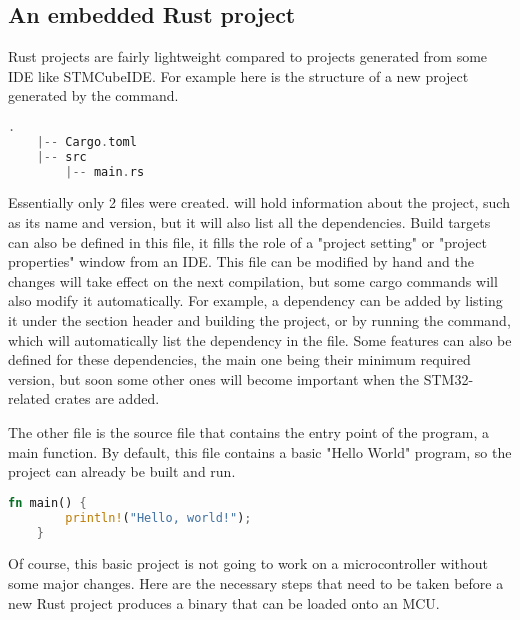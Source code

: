 \subsection{An embedded Rust project}

Rust projects are fairly lightweight compared to projects generated from some IDE like STMCubeIDE. For example here is the structure of a new project generated by the  command.

\begin{lstlisting}[language=C,frame=single,float=!ht,label={lst:rust-project-structure},caption={Rust Project Structure}]
    .
    |-- Cargo.toml
    |-- src
        |-- main.rs

\end{lstlisting}

Essentially only 2 files were created.  will hold information about the project, such as its name and version, but it will also list all the dependencies. Build targets can also be defined in this file, it fills the role of a "project setting" or "project properties" window from an IDE. This file can be modified by hand and the changes will take effect on the next compilation, but some cargo commands will also modify it automatically. For example, a dependency can be added by listing it under the \mycode{[dependencies]} section header and building the project, or by running the  command, which will automatically list the dependency in the file. Some features can also be defined for these dependencies, the main one being their minimum required version, but soon some other ones will become important when the STM32-related crates are added.

The other file is the  source file that contains the entry point of the program, a main function. By default, this file contains a basic "Hello World" program, so the project can already be built and run.

\begin{lstlisting}[language=Rust,frame=single,float=!ht,style=customrust,label={lst:rust-hello-world},caption={Rust Hello World Porgram}]
    fn main() {
        println!("Hello, world!");
    }
\end{lstlisting}

Of course, this basic project is not going to work on a microcontroller without some major changes. Here are the necessary steps that need to be taken before a new Rust project produces a binary that can be loaded onto an MCU.

